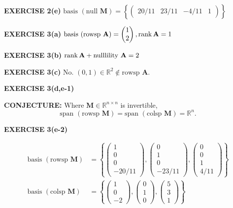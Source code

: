 \documentclass[12pt]{article}
\newcommand{\mat}[1]{\mathbf{#1}}
\newcommand{\exercise}[1]{\textbf{EXERCISE #1}\label{#1}}
\newcommand{\conjecture}[1]{\textbf{CONJECTURE:} #1}
\newcommand{\nullsp}{\text{null }}
\newcommand{\nullility}{\text{nulllility }}
\newcommand{\rowsp}{\text{rowsp }}
\newcommand{\colsp}{\text{colsp }}
\newcommand{\basis}{\text{basis }}
\newcommand{\vspan}{\text{span }}
\begin{document}
\exercise{2(e)} $\basis (\nullsp \mat{M}) = \left\{ \begin{pmatrix} 20/11 & 23/11 & -4/11 & 1 \end{pmatrix} \right\}$

\exercise{3(a)} $\basis (\rowsp \mat{A}) = \begin{pmatrix} 1 \\ 2 \end{pmatrix}, \rank \mat{A} = 1$

\exercise{3(b)} $\rank \mat{A} + \nullility \mat{A} = 2$

\exercise{3(c)} No. $(0,1) \in \mathbb{R}^{2} \not\in \rowsp \mat{A}$.

\exercise{3(d,e-1)}

\conjecture{Where $\mat{M} \in \mathbb{R}^{n \times n}$ is invertible, $$\vspan( \rowsp \mat{M} ) = \vspan( \colsp \mat{M} ) = \mathbb{R}^{n}.$$}

\exercise{3(e-2)} 

\begin{align*}
\basis(\rowsp \mat{M}) &= \left\{ \begin{pmatrix} 1 \\ 0 \\ 0 \\ -20/11 \end{pmatrix}, \begin{pmatrix} 0 \\ 1 \\ 0 \\ -23/11 \end{pmatrix}, \begin{pmatrix} 0 \\ 0 \\ 1 \\ 4/11 \end{pmatrix} \right\} \\
\basis(\colsp \mat{M}) &= \left\{ \begin{pmatrix}  1 \\ 0 \\ -2 \end{pmatrix}, \begin{pmatrix} 0 \\ 1 \\ 0 \end{pmatrix}, \begin{pmatrix} 5 \\ 3 \\ 1 \end{pmatrix} \right\}
\end{align*}
\end{document}
